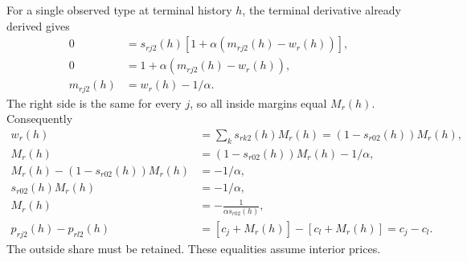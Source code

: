 \documentclass[12pt]{article}
\theoremstyle{definition}
\theoremstyle{remark}
\numberwithin{equation}{section}
\begin{document}
For a single observed type at terminal history $h$, the terminal derivative
already derived gives
\begin{align}
 0&=s_{rj2}(h)[1+\alpha(m_{rj2}(h)-w_r(h))],\\
 0&=1+\alpha(m_{rj2}(h)-w_r(h)),\\
 m_{rj2}(h)&=w_r(h)-1/\alpha.
\end{align}
The right side is the same for every $j$, so all inside margins equal $M_r(h)$.
Consequently
\begin{align}
 w_r(h)&=\sum_ks_{rk2}(h)M_r(h)
       =(1-s_{r02}(h))M_r(h),\\
 M_r(h)&=(1-s_{r02}(h))M_r(h)-1/\alpha,\\
 M_r(h)-(1-s_{r02}(h))M_r(h)&=-1/\alpha,\\
 s_{r02}(h)M_r(h)&=-1/\alpha,\\
 M_r(h)&=-\frac1{\alpha s_{r02}(h)},\\
 p_{rj2}(h)-p_{rl2}(h)
 &=[c_j+M_r(h)]-[c_l+M_r(h)]=c_j-c_l.
\end{align}
The outside share must be retained. These equalities assume interior prices.
\end{document}
